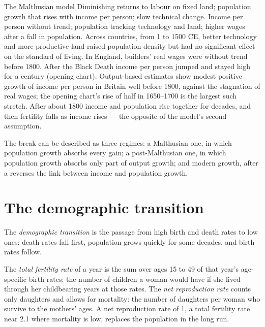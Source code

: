 \begin{model}{The Malthusian model}
\assumes Diminishing returns to labour on fixed land; population growth that rises
with income per person; slow technical change.
\predicts Income per person without trend; population tracking technology and land;
higher wages after a fall in population.
\tested Across countries, from 1 to 1500 CE, better technology and more productive land raised
population density but had no significant effect on the standard of living. %
In England, builders' real wages were without trend before 1800. %
After the Black Death income per person jumped and stayed high for a century (opening
chart).
\breaks Output-based estimates show modest positive growth of income per person in
Britain well before 1800, against the stagnation of real wages; the opening chart's
rise of half in 1650--1700 is the largest such stretch. %
After about 1800 income and population rise together for decades, and then fertility
falls as income rises --- the opposite of the model's second assumption.
\end{model}

The break can be described as three regimes: a Malthusian one, in which population
growth absorbs every gain; a post-Malthusian one, in which population growth absorbs
only part of output growth; and modern growth, after a 
reverses the link between income and population growth. %

\section{The demographic transition}\label{sec:b3:demographic-transition:transition}

\begin{definition}\label{def:b3:demographic-transition:transition}
The \emph{demographic transition} is the passage from high birth and death rates to
low ones: death rates fall first, population grows quickly for some decades, and
birth rates follow.
\end{definition}

\begin{definition}\label{def:b3:demographic-transition:tfr}
The \emph{total fertility rate} of a year is the sum over ages 15 to 49 of that year's age-specific
birth rates: the number of children a woman would have if she lived through her
childbearing years at those rates. The \emph{net reproduction rate} counts only
daughters and allows for mortality: the number of daughters per woman who survive to
the mothers' ages. A net reproduction rate of 1, a total fertility rate near 2.1 where mortality is low,
replaces the population in the long run.
\end{definition}


